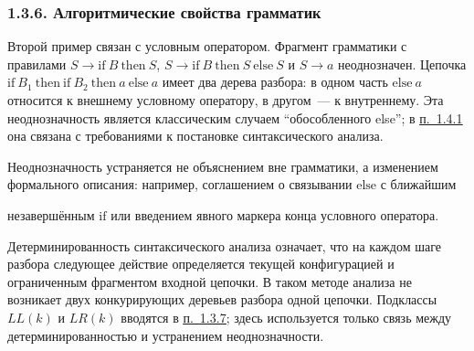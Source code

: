 \documentclass[mathserif,12pt,aspectratio=169]{beamer}
\def\DMref#1#2{{\color{blue}\underline{\hyperlink{#2}{#1}}}}
\begin{document}
\begin{frame}[t]
	\frametitle{1.3.6. Алгоритмические свойства грамматик }
	\setlength{\parskip}{1pt}
	\sloppy
	
	
	\begin{example}
		Второй пример связан с условным оператором. Фрагмент грамматики с правилами $S\to \mathrm{if}\ B\ \mathrm{then}\ S$, $S\to \mathrm{if}\ B\ \mathrm{then}\ S\ \mathrm{else}\ S$ и $S\to a$ неоднозначен. Цепочка $\mathrm{if}\ B_1\ \mathrm{then}\ \mathrm{if}\ B_2\ \mathrm{then}\ a\ \mathrm{else}\ a$ имеет два дерева разбора: в одном часть $\mathrm{else}\ a$ относится к внешнему условному оператору, в другом~--- к внутреннему. Эта неоднозначность является классическим случаем ``обособленного else''; в \DMref{п.~1.4.1}{1.4.1.} она связана с требованиями к постановке синтаксического анализа.
	\end{example}
	
	\begin{remark}
		Неоднозначность устраняется не объяснением вне грамматики, а изменением формального описания: например, соглашением о связывании $\mathrm{else}$ с ближайшим
		
		незавершённым $\mathrm{if}$ или введением явного маркера конца условного оператора.
	\end{remark}
	
	Детерминированность синтаксического анализа означает, что на каждом шаге разбора следующее действие определяется текущей конфигурацией и ограниченным фрагментом входной цепочки. В таком методе анализа не возникает двух конкурирующих деревьев разбора одной цепочки. Подклассы $LL(k)$ и $LR(k)$ вводятся в \DMref{п.~1.3.7}{1.3.7.}; здесь используется только связь между детерминированностью и устранением неоднозначности.
	
\end{frame}
\end{document}
